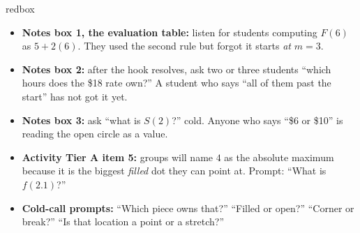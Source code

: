 \documentclass[10pt]{article}
\begin{document}
\begin{skillbox}{redbox}
\begin{itemize}[leftmargin=1.2em, itemsep=2pt, topsep=2pt]
  \item \textbf{Notes box 1, the evaluation table:} listen for students computing $F(6)$ as
        $5+2(6)$. They used the second rule but forgot it starts \emph{at} $m=3$.
  \item \textbf{Notes box 2:} after the hook resolves, ask two or three students ``which hours does
        the \$18 rate own?'' A student who says ``all of them past the start'' has not got it yet.
  \item \textbf{Notes box 3:} ask ``what is $S(2)$?'' cold. Anyone who says ``\$6 or \$10'' is
        reading the open circle as a value.
  \item \textbf{Activity Tier A item 5:} groups will name $4$ as the absolute maximum because it is
        the biggest \emph{filled} dot they can point at. Prompt: ``What is $f(2.1)$?''
  \item \textbf{Cold-call prompts:} ``Which piece owns that?'' ``Filled or open?'' ``Corner or
        break?'' ``Is that location a point or a stretch?''
\end{itemize}
\end{skillbox}
\end{document}
